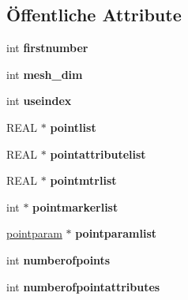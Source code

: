 \subsection*{Öffentliche Attribute}
\begin{DoxyCompactItemize}
\item 
\hypertarget{classtetgenio_ace3ae3f90741f8e51e02f5007d81e440}{int {\bfseries firstnumber}}\label{classtetgenio_ace3ae3f90741f8e51e02f5007d81e440}

\item 
\hypertarget{classtetgenio_a79a469ad1e88f5830d2fcefe9a8ca53f}{int {\bfseries mesh\-\_\-dim}}\label{classtetgenio_a79a469ad1e88f5830d2fcefe9a8ca53f}

\item 
\hypertarget{classtetgenio_ae95528b3d4525a3584dd26cadb8035ad}{int {\bfseries useindex}}\label{classtetgenio_ae95528b3d4525a3584dd26cadb8035ad}

\item 
\hypertarget{classtetgenio_a69b1e0f645f57281d838569c2bbc5789}{R\-E\-A\-L $\ast$ {\bfseries pointlist}}\label{classtetgenio_a69b1e0f645f57281d838569c2bbc5789}

\item 
\hypertarget{classtetgenio_a4273b235ec6260723bae849c3184ae6f}{R\-E\-A\-L $\ast$ {\bfseries pointattributelist}}\label{classtetgenio_a4273b235ec6260723bae849c3184ae6f}

\item 
\hypertarget{classtetgenio_adc248b0a839167ad5389711798613114}{R\-E\-A\-L $\ast$ {\bfseries pointmtrlist}}\label{classtetgenio_adc248b0a839167ad5389711798613114}

\item 
\hypertarget{classtetgenio_afc154d429cb5344b1ea12318b094a2c8}{int $\ast$ {\bfseries pointmarkerlist}}\label{classtetgenio_afc154d429cb5344b1ea12318b094a2c8}

\item 
\hypertarget{classtetgenio_ab7bc1e01d32b9c2f9537ccecac5a4a04}{\hyperlink{structtetgenio_1_1pointparam}{pointparam} $\ast$ {\bfseries pointparamlist}}\label{classtetgenio_ab7bc1e01d32b9c2f9537ccecac5a4a04}

\item 
\hypertarget{classtetgenio_a5211bec795ba870c01fadade4cd8670f}{int {\bfseries numberofpoints}}\label{classtetgenio_a5211bec795ba870c01fadade4cd8670f}

\item 
\hypertarget{classtetgenio_a3d263e577de1fa81296abe9a6ba029b0}{int {\bfseries numberofpointattributes}}\label{classtetgenio_a3d263e577de1fa81296abe9a6ba029b0}


\end{DoxyCompactItemize}
